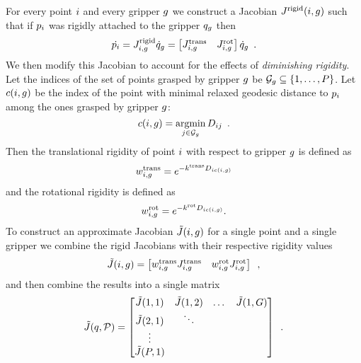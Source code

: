 For every point $i$ and every gripper $g$ we construct a Jacobian $J^{\textrm{rigid}}(i, g)$ such that if $p_i$ was rigidly attached to the gripper $q_g$ then
\begin{equation}
    \dot{p_i} = J^{\textrm{rigid}}_{i, g} \dot{q}_g = 
    \begin{bmatrix} J^{\textrm{trans}}_{i, g} & J^{\textrm{rot}}_{i, g} \end{bmatrix} \dot{q}_g \enspace .
\end{equation}
We then modify this Jacobian to account for the effects of \textit{diminishing rigidity}. Let the indices of the set of points grasped by gripper $g$ be $\mathcal{G}_g \subseteq \{1, \dots, P \}$. Let $c(i, g)$ be the index of the point with minimal relaxed geodesic distance to $p_i$ among the ones grasped by gripper $g$:
\begin{equation}
    c(i, g) = \operatorname*{argmin}_{j \in \mathcal{G}_g} D_{i j} \enspace .
\end{equation}
Then the translational rigidity of point $i$ with respect to gripper $g$ is defined as
\begin{equation}
    w^{\textrm{trans}}_{i, g} = e^{-k^{\textrm{trans}} D_{i c(i, g)}}
\end{equation}
and the rotational rigidity is defined as
\begin{equation}
    w^{\textrm{rot}}_{i, g} = e^{-k^{\textrm{rot}} D_{i c(i, g)}}.
\end{equation}
To construct an approximate Jacobian $\tilde {J}(i, g)$ for a single point and a single gripper we combine the rigid Jacobians with their respective rigidity values
\begin{equation}
    \tilde {J}(i, g) = \begin{bmatrix} w^{\textrm{trans}}_{i, g} J^{\textrm{trans}}_{i, g} & w^{\textrm{rot}}_{i, g} J^{\textrm{rot}}_{i, g} \end{bmatrix} \enspace,
\end{equation}
and then combine the results into a single matrix
\begin{equation}
    \tilde {J}(q, \mathcal{P}) = 
    \begin{bmatrix}
        \tilde {J}(1,1) & \tilde {J}(1,2) & \dots & \tilde {J}(1, G) \\
        \tilde {J}(2,1) & \ddots \\
        \vdots \\
        \tilde {J}(P,1)
    \end{bmatrix} \enspace .
\end{equation}

